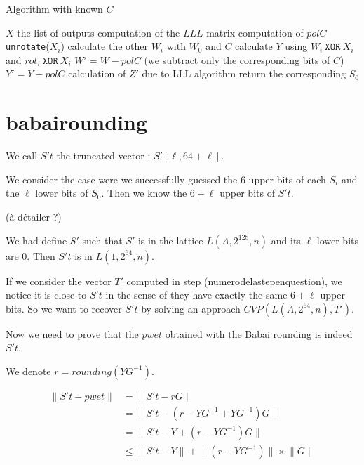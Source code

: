 \documentclass[preprint]{iacrtrans}
\begin{document}
\begin{algorithm}[h!]
\caption{Algorithm with known $C$}
\begin{algorithmic}
\REQUIRE $X$ the list of outputs
\STATE computation of the $LLL$ matrix
\STATE computation of $polC$
        \STATE \texttt{unrotate}($X_i$)
    \ENDFOR
        \STATE calculate the other $W_i$ with $W_0$ and $C$
        \STATE calculate $Y$ using $W_i\ \mathtt{XOR}\ X_i$ and $rot_i\ \mathtt{XOR}\ X_i$
        \STATE $W' = W - polC$ (we subtract only the corresponding bits of $C$)
        \STATE $Y' = Y - polC$
        \STATE calculation of $Z'$ due to LLL algorithm
                \STATE return the corresponding $S_0$
            \ENDIF
        \ENDIF
    \ENDFOR
\ENDFOR
\end{algorithmic}
\end{algorithm}

\section{babairounding}

We call \(S't\) the truncated vector : \(S'[\ell,64+\ell]\).

We consider the case were we successfully guessed the 6 upper bits of each \(S_i\) and the \(\ell\) lower bits of \(S_0\). Then we know the \(6+\ell\) upper bits of \(S't\).

(à détailer ?)	

We had define \(S'\) such that \(S'\) is in the lattice \(L(A,2^{128},n)\) and its \(\ell \) lower bits are 0. Then \(S't\) is in \(L(1,2^{64},n)\).

If we consider the vector \(T'\) computed in step (numerodelastepenquestion), we notice it is close to \(S't\) in the sense of they have exactly the same \(6+\ell\) upper bits. So we want to recover \(S't\) by solving an approach \(CVP(L(A,2^{64},n),T')\).

Now we need to prove that the \(pwet\) obtained with the Babai rounding is indeed \(S't\).

We denote \(r = rounding(YG^{-1}) \).

\begin{align*}
\lVert S't - pwet \rVert &= \lVert S't - rG \rVert \\
&= \lVert S't - (r-YG^{-1} + YG^{-1})G \rVert\\
&= \lVert S't - Y + (r-YG^{-1})G \rVert\\
&\leqslant \lVert S't - Y \rVert + \lVert(r-YG^{-1})\rVert \times \lVert G\rVert\\	
\end{align*}
\end{document}
